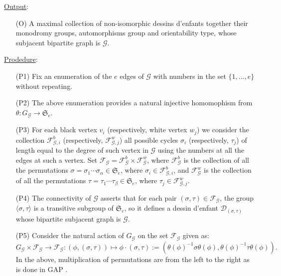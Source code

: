 \documentclass[12pt]{amsart}
\theoremstyle{remark}
\begin{document}
\underline{Output}:
\begin{enumerate}
\item[(O)] A maximal collection of non-isomorphic dessins d'enfants together their monodromy groups, automorphisms group and orientability type, whose subjacent bipartite graph is ${\mathcal G}$.
\end{enumerate}

\underline{Prodedure}:
\begin{enumerate}
\item[(P1)] Fix an enumeration of the $e$ edges of ${\mathcal G}$ with numbers in the set $\{1,\ldots,e\}$ without repeating. 

\item[(P2)] The above enumeration provides a natural injective homomophism from $\theta:G_{\mathcal G} \to {\mathfrak S}_{e}$.

\item[(P3)] For each black vertex $v_{i}$ (respectively, white vertex $w_{j}$) we consider the collection ${\mathcal F}_{{\mathcal G},i}^{b}$ (respectively, ${\mathcal F}_{{\mathcal G},j}^{w}$) all possible cycles $\sigma_{i}$ (respectively, $\tau_{j}$) of length equal to the degree of such vertex in ${\mathcal G}$ using the numbers at all the edges at such a vertex. Set 
${\mathcal F}_{\mathcal G}={\mathcal F}_{\mathcal G}^{b} \times {\mathcal F}_{\mathcal G}^{w}$, where
${\mathcal F}_{\mathcal G}^{b}$ is the collection of all the permutations $\sigma=\sigma_{1}\cdots\sigma_{\alpha} \in {\mathfrak S}_{e}$, where $\sigma_{i} \in {\mathcal F}_{{\mathcal G},i}^{b}$,  and 
${\mathcal F}_{\mathcal G}^{w}$ is the collection of all the permutations $\tau=\tau_{1}\cdots\tau_{\beta} \in {\mathfrak S}_{e}$, where $\tau_{j} \in {\mathcal F}_{{\mathcal G},j}^{w}$. 

\item[(P4)] The connectivity of ${\mathcal G}$ asserts that for each pair $(\sigma,\tau) \in {\mathcal F}_{\mathcal G}$, the group $\langle \sigma, \tau\rangle$ is a transitive subgroup of ${\mathfrak S}_{e}$, so it defines a dessin d'enfant ${\mathcal D}_{(\sigma,\tau)}$ whose bipartite subjacent graph is ${\mathcal G}$. 

\item[(P5)] Consider the natural action of $G_{\mathcal G}$ on the set ${\mathcal F}_{\mathcal G}$ given as:
$$G_{\mathcal G} \times {\mathcal F}_{\mathcal G} \to {\mathcal F}_{\mathcal G}: (\phi, (\sigma,\tau)) \mapsto\phi \cdot (\sigma,\tau):=\left(\theta(\phi)^{-1} \sigma \theta(\phi), \theta(\phi)^{-1} \tau \theta(\phi)\right).$$
In the above, multiplication of permutations are from the left to the right as is done in GAP \cite{GAP}.


\end{enumerate}
\end{document}
